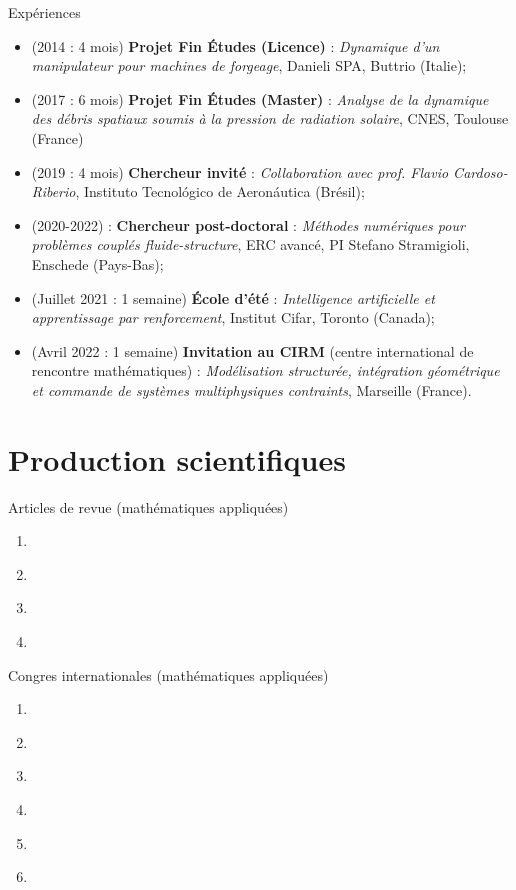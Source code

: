 \documentclass[aspectratio=169, french]{beamer}
\begin{document}
\begin{frame}{Expériences}
\begin{itemize}
\item (2014 : 4 mois) \textbf{Projet Fin Études (Licence)} : \textit{Dynamique d’un manipulateur pour machines de forgeage}, Danieli SPA, Buttrio (Italie);
\item (2017 : 6 mois) \textbf{Projet Fin Études (Master)} : \textit{Analyse de la dynamique des débris spatiaux soumis à la pression de radiation solaire}, CNES, Toulouse (France)
\item (2019 : 4 mois) \textbf{Chercheur invité} : \textit{Collaboration avec prof. Flavio Cardoso-Riberio}, Instituto Tecnológico de Aeronáutica (Brésil);
\item (2020-2022) : \textbf{Chercheur post-doctoral} : \textit{Méthodes numériques pour problèmes couplés fluide-structure}, ERC avancé, PI Stefano Stramigioli, Enschede (Pays-Bas);
\item (Juillet 2021 : 1 semaine) \textbf{École d'été} : \textit{Intelligence artificielle et apprentissage par renforcement}, Institut Cifar, Toronto (Canada);
\item (Avril 2022 : 1 semaine) \textbf{Invitation au CIRM} (centre international de rencontre mathématiques) : \textit{Modélisation structurée, intégration géométrique et commande de systèmes multiphysiques contraints}, Marseille (France).
\end{itemize}
  
\end{frame}

\section{Production scientifiques}

\begin{frame}{Articles de revue (mathématiques appliquées)}
\begin{enumerate}
	\item \cite{brugnoli2022df}
	\item \cite{brugnoli2021num}
	\item \cite{brugnoli2019ammmin}
	\item \cite{brugnoli2019ammkir}
\end{enumerate}


\end{frame}


\begin{frame}{Congres internationales (mathématiques appliquées)}
\footnotesize	
\begin{enumerate}
	\item \cite{brugnoli2021vk}
	\item \cite{rashad2021ext}
	\item \cite{cherifi2021data}
	\item \cite{brugnoli2021siamcse}
	\item \cite{brugnoli2020mtns}
	\item \cite{brugnoli2019cpde}
\end{enumerate}

\end{frame}
\end{document}
